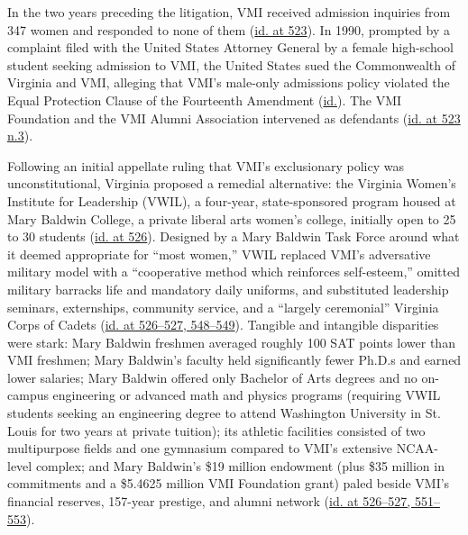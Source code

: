 \documentclass[12pt]{article}
\begin{document}
In the two years preceding the litigation, VMI received admission inquiries from 347 women and responded to none of them (\href{https://supreme.justia.com/cases/federal/us/518/515/}{id. at 523}). In 1990, prompted by a complaint filed with the United States Attorney General by a female high-school student seeking admission to VMI, the United States sued the Commonwealth of Virginia and VMI, alleging that VMI's male-only admissions policy violated the Equal Protection Clause of the Fourteenth Amendment (\href{https://supreme.justia.com/cases/federal/us/518/515/}{id.}). The VMI Foundation and the VMI Alumni Association intervened as defendants (\href{https://supreme.justia.com/cases/federal/us/518/515/}{id. at 523 n.3}).

Following an initial appellate ruling that VMI's exclusionary policy was unconstitutional, Virginia proposed a remedial alternative: the Virginia Women's Institute for Leadership (VWIL), a four-year, state-sponsored program housed at Mary Baldwin College, a private liberal arts women's college, initially open to 25 to 30 students (\href{https://supreme.justia.com/cases/federal/us/518/515/}{id. at 526}). Designed by a Mary Baldwin Task Force around what it deemed appropriate for ``most women,'' VWIL replaced VMI's adversative military model with a ``cooperative method which reinforces self-esteem,'' omitted military barracks life and mandatory daily uniforms, and substituted leadership seminars, externships, community service, and a ``largely ceremonial'' Virginia Corps of Cadets (\href{https://supreme.justia.com/cases/federal/us/518/515/}{id. at 526--527, 548--549}). Tangible and intangible disparities were stark: Mary Baldwin freshmen averaged roughly 100 SAT points lower than VMI freshmen; Mary Baldwin's faculty held significantly fewer Ph.D.s and earned lower salaries; Mary Baldwin offered only Bachelor of Arts degrees and no on-campus engineering or advanced math and physics programs (requiring VWIL students seeking an engineering degree to attend Washington University in St. Louis for two years at private tuition); its athletic facilities consisted of two multipurpose fields and one gymnasium compared to VMI's extensive NCAA-level complex; and Mary Baldwin's \$19 million endowment (plus \$35 million in commitments and a \$5.4625 million VMI Foundation grant) paled beside VMI's financial reserves, 157-year prestige, and alumni network (\href{https://supreme.justia.com/cases/federal/us/518/515/}{id. at 526--527, 551--553}).
\end{document}
